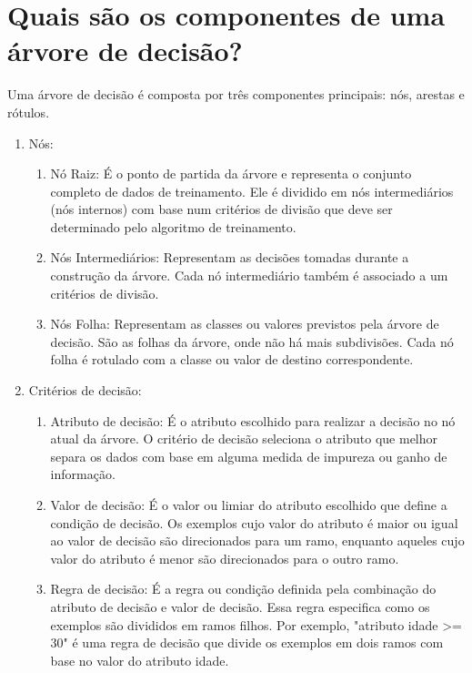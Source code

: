 \documentclass[12pt,a4paper, brazil]{article}
\begin{document}
\section{Quais são os componentes de uma árvore de decisão?}

Uma árvore de decisão é composta por três componentes principais: nós, arestas e rótulos.

\begin{enumerate}
    \item Nós:
    \begin{enumerate}
        \item Nó Raiz: É o ponto de partida da árvore e representa o conjunto completo de dados de treinamento. Ele é dividido em nós intermediários (nós internos) com base num critérios de divisão que deve ser determinado pelo algoritmo de treinamento.
        \item Nós Intermediários: Representam as decisões tomadas durante a construção da árvore. Cada nó intermediário também é associado a um critérios de divisão.
        \item Nós Folha: Representam as classes ou valores previstos pela árvore de decisão. São as folhas da árvore, onde não há mais subdivisões. Cada nó folha é rotulado com a classe ou valor de destino correspondente.
    \end{enumerate}
       
    \item Critérios de decisão:
        \begin{enumerate}
            \item Atributo de decisão: É o atributo escolhido para realizar a decisão no nó atual da árvore. O critério de decisão seleciona o atributo que melhor separa os dados com base em alguma medida de impureza ou ganho de informação.

            \item Valor de decisão: É o valor ou limiar do atributo escolhido que define a condição de decisão. Os exemplos cujo valor do atributo é maior ou igual ao valor de decisão são direcionados para um ramo, enquanto aqueles cujo valor do atributo é menor são direcionados para o outro ramo.
            
            \item Regra de decisão: É a regra ou condição definida pela combinação do atributo de decisão e valor de decisão. Essa regra especifica como os exemplos são divididos em ramos filhos. Por exemplo, "atributo idade >= 30" é uma regra de decisão que divide os exemplos em dois ramos com base no valor do atributo idade.    
        \end{enumerate}
    

\end{enumerate}
\end{document}
